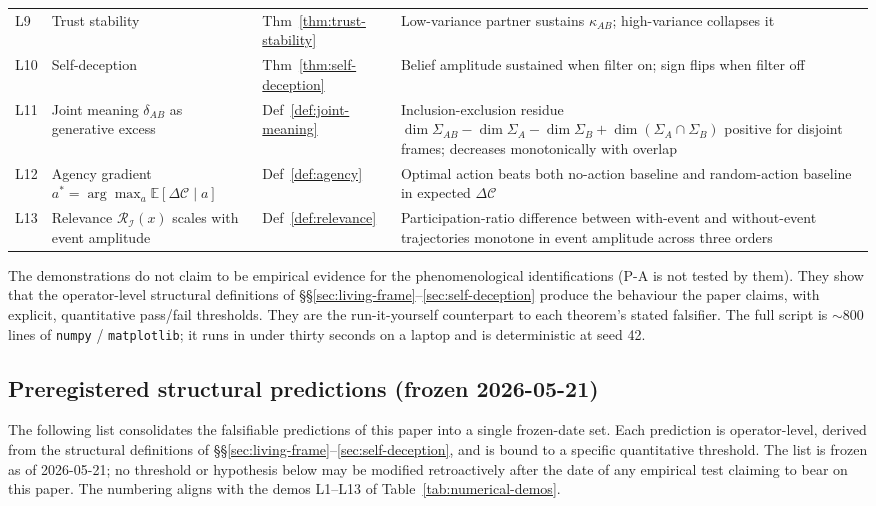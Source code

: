 \documentclass[11pt]{article}
\theoremstyle{plain}
\theoremstyle{definition}
\theoremstyle{remark}
\newcommand{\Ical}{\mathcal{I}}
\newcommand{\Ccal}{\mathcal{C}}
\newcommand{\Rcal}{\mathcal{R}}
\begin{document}
\begin{table}[h]
\begin{tabular}{p{0.8cm}p{4cm}p{3.4cm}p{4.8cm}}
L9 & Trust stability & Thm~\ref{thm:trust-stability} & Low-variance partner sustains $\kappa_{AB}$; high-variance collapses it \\
L10 & Self-deception & Thm~\ref{thm:self-deception} & Belief amplitude sustained when filter on; sign flips when filter off \\
L11 & Joint meaning $\delta_{AB}$ as generative excess & Def~\ref{def:joint-meaning} & Inclusion-exclusion residue $\dim \Sigma_{AB} - \dim \Sigma_A - \dim \Sigma_B + \dim(\Sigma_A \cap \Sigma_B)$ positive for disjoint frames; decreases monotonically with overlap \\
L12 & Agency gradient $a^* = \arg\max_a \mathbb{E}[\Delta \Ccal \mid a]$ & Def~\ref{def:agency} & Optimal action beats both no-action baseline and random-action baseline in expected $\Delta \Ccal$ \\
L13 & Relevance $\Rcal_\Ical(x)$ scales with event amplitude & Def~\ref{def:relevance} & Participation-ratio difference between with-event and without-event trajectories monotone in event amplitude across three orders \\
\bottomrule
\end{tabular}
\end{table}

The demonstrations do not claim to be empirical evidence for the phenomenological identifications (P-A is not tested by them). They show that the operator-level structural definitions of \S\S\ref{sec:living-frame}--\ref{sec:self-deception} produce the behaviour the paper claims, with explicit, quantitative pass/fail thresholds. They are the run-it-yourself counterpart to each theorem's stated falsifier. The full script is $\sim 800$ lines of \texttt{numpy} / \texttt{matplotlib}; it runs in under thirty seconds on a laptop and is deterministic at seed 42.

\subsection{Preregistered structural predictions (frozen 2026-05-21)}\label{sec:preregistered-life}

The following list consolidates the falsifiable predictions of this paper into a single frozen-date set. Each prediction is operator-level, derived from the structural definitions of \S\S\ref{sec:living-frame}--\ref{sec:self-deception}, and is bound to a specific quantitative threshold. The list is frozen as of 2026-05-21; no threshold or hypothesis below may be modified retroactively after the date of any empirical test claiming to bear on this paper. The numbering aligns with the demos L1--L13 of Table~\ref{tab:numerical-demos}.
\end{document}

